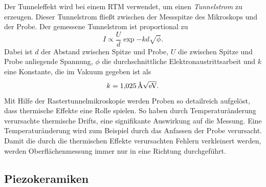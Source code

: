 Der Tunneleffekt wird bei einem RTM verwendet, um einen \emph{Tunnelstrom} zu erzeugen. Dieser Tunnelstrom
fließt zwischen der Messspitze des Mikroskops und der Probe.
Der gemessene Tunnelstrom ist proportional zu %
\begin{equation}
  \label{eq: tunnelstrom}
I\propto \frac{U}{d}\exp{-kd\sqrt{\phi}}.
\end{equation}
Dabei ist $d$ der Abstand zwischen Spitze und Probe, $U$ die zwischen Spitze und Probe anliegende Spannung,
$\phi$ die durchschnittliche Elektronaustrittsarbeit und $k$ eine Konstante, die im Vakuum gegeben ist als
\begin{equation*}
  k=\SI{1.025}{\per\angstrom\sqrt{\eV}}.
\end{equation*}
Mit Hilfe der Rastertunnelmikroskopie werden Proben so detailreich aufgelöst, dass thermische Effekte eine Rolle spielen. %
So haben durch Temperaturänderung verursachte thermische Drifts, eine signifikante Auswirkung auf die Messung. %
Eine Temperaturänderung wird zum Beispiel durch das Anfassen der Probe verursacht.
Damit die durch die thermischen Effekte verursachten Fehlern verkleinert werden,
werden Oberflächenmessung immer nur in eine Richtung durchgeführt.

\subsection{Piezokeramiken}

